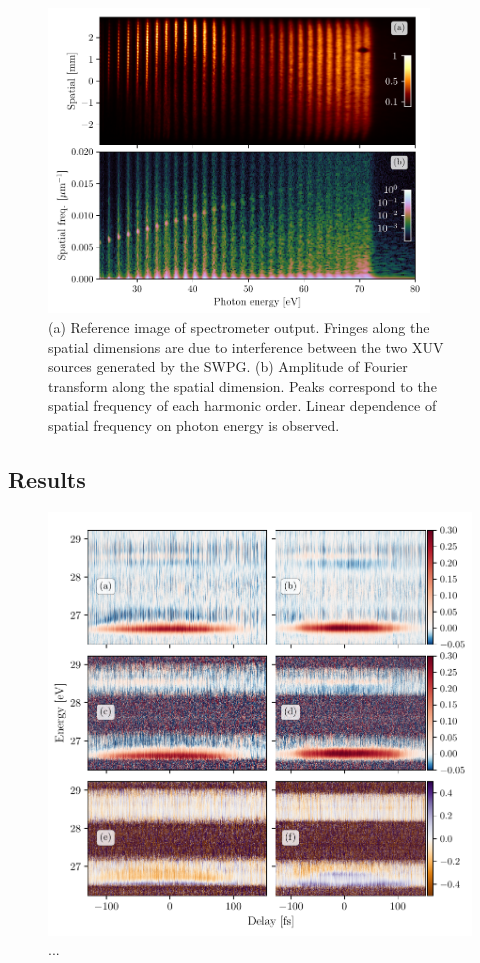 \begin{figure}
	\centering
	\includegraphics[width=0.9\textwidth]{figures/CATS/ref_image_FFT.pdf}
	\caption[Reference camera image and spatial Fourier transform used in CATS]{(a) Reference image of spectrometer output.  Fringes along the spatial dimensions are due to interference between the two XUV sources generated by the SWPG. (b) Amplitude of Fourier transform along the spatial dimension. Peaks correspond to the spatial frequency of each harmonic order.  Linear dependence of spatial frequency on photon energy is observed.}
	\label{fig:ref_image_FFT}
\end{figure}



\subsection{Results}
\label{sec:CATS_ar_results}


\begin{figure}
	\centering
	\includegraphics[width=1.0\textwidth]{figures/CATS/delay_high_low.pdf}
	\caption[...]{...}
	\label{fig:delay_high_low}
\end{figure}


